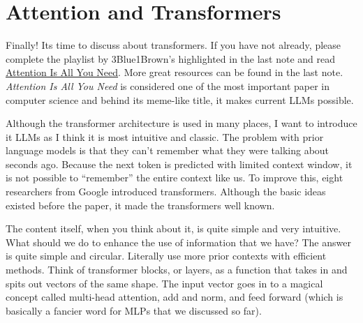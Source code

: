 \documentclass[../../main.tex]{subfiles}
\begin{document}
\section{Attention and Transformers}

Finally! Its time to discuss about transformers. If you have not
already, please complete the playlist by 3Blue1Brown's highlighted
in the last note and read \href{https://arxiv.org/abs/1706.03762}
{Attention Is All You Need}. More great resources can be found in
the last note. \textit{Attention Is All You Need} is considered one
of the most important paper in computer science and behind its
meme-like title, it makes current LLMs possible.

Although the transformer architecture is used in many places, I want
to introduce it LLMs as I think it is most intuitive and classic.
The problem with prior language models is that they can't remember
what they were talking about seconds ago. Because the next token
is predicted with limited context window, it is not possible to
``remember'' the entire context like us. To improve this, eight
researchers from Google introduced transformers. Although the basic
ideas existed before the paper, it made the transformers well known.

The content itself, when you think about it, is quite simple and
very intuitive. What should we do to enhance the use of information
that we have? The answer is quite simple and circular. Literally use
more prior contexts with efficient methods. Think of transformer
blocks, or layers, as a function that takes in and spits out vectors
of the same shape. The input vector goes in to a magical concept
called multi-head attention, add and norm, and feed forward (which is
basically a fancier word for MLPs that we discussed so far).
\end{document}
